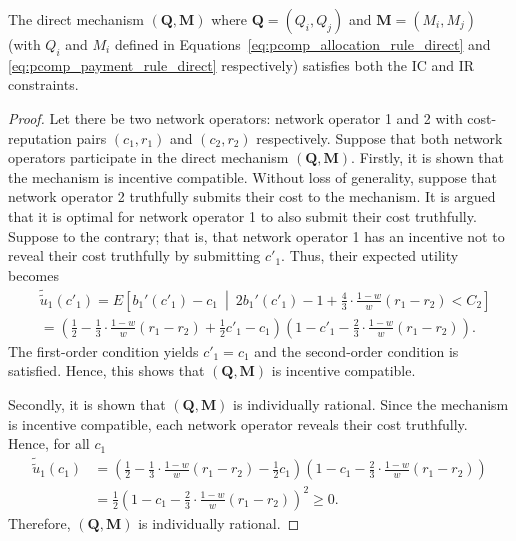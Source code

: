 \begin{propositiona}[\ref{prop:pcomp_direct_mechanism_direct}]
The direct mechanism $(\mathbf{Q},\mathbf{M})$ where $\mathbf{Q}=(Q_i,Q_j)$ and $\mathbf{M}=(M_i,M_j)$ (with $Q_i$ and $M_i$ defined in Equations~\eqref{eq:pcomp_allocation_rule_direct} and \eqref{eq:pcomp_payment_rule_direct} respectively) satisfies both the IC and IR constraints.
\end{propositiona}
\begin{proof}
Let there be two network operators: network operator 1 and 2 with cost-reputation pairs $(c_1,r_1)$ and $(c_2,r_2)$ respectively. Suppose that both network operators participate in the direct mechanism $(\mathbf{Q},\mathbf{M})$. Firstly, it is shown that the mechanism is incentive compatible. Without loss of generality, suppose that network operator 2 truthfully submits their cost to the mechanism. It is argued that it is optimal for network operator 1 to also submit their cost truthfully. Suppose to the contrary; that is, that network operator 1 has an incentive not to reveal their cost truthfully by submitting $c'_1$. Thus, their expected utility becomes
\begin{align}
	&\tilde{\tilde{u}}_1(c'_1) = E\left[ b_1'(c'_1) - c_1 \:\middle\vert\: 2b_1'(c'_1) - 1 + \frac{4}{3}\cdot\frac{1-w}{w}(r_1-r_2) < C_2 \right] \\\nonumber
	&= \left(\frac{1}{2} - \frac{1}{3}\cdot\frac{1-w}{w}(r_1-r_2) + \frac{1}{2}c'_1 - c_1 \right)\left(1 - c'_1 - \frac{2}{3}\cdot\frac{1-w}{w}(r_1-r_2)\right).
\end{align}
The first-order condition yields $c'_1 = c_1$ and the second-order condition is satisfied. Hence, this shows that $(\mathbf{Q},\mathbf{M})$ is incentive compatible.

Secondly, it is shown that $(\mathbf{Q},\mathbf{M})$ is individually rational. Since the mechanism is incentive compatible, each network operator reveals their cost truthfully. Hence, for all $c_1$
\begin{align}
	\tilde{\tilde{u}}_1(c_1) &= \left(\frac{1}{2} - \frac{1}{3}\cdot\frac{1-w}{w}(r_1-r_2) - \frac{1}{2}c_1 \right)\left(1 - c_1 - \frac{2}{3}\cdot\frac{1-w}{w}(r_1-r_2)\right)\\\nonumber
	&= \frac{1}{2}\left( 1 - c_1 - \frac{2}{3}\cdot\frac{1-w}{w}(r_1-r_2) \right)^2 \ge 0.
\end{align}
Therefore, $(\mathbf{Q},\mathbf{M})$ is individually rational.
\end{proof}

